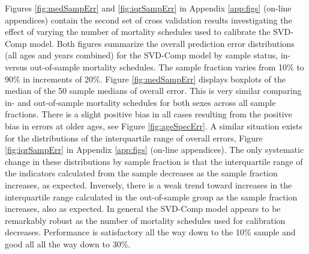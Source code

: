 \documentclass[11pt]{article}
\begin{document}
Figures \ref{fig:medSampErr} and \ref{fig:iqrSampErr} in Appendix \ref{app:figs} (on-line appendices) contain the second set of cross validation results investigating the effect of varying the number of mortality schedules used to calibrate the SVD-Comp model.  Both figures summarize the overall prediction error distributions (all ages and years combined) for the SVD-Comp model by sample status, in- versus out-of-sample mortality schedules.  The sample fraction varies from 10\% to 90\% in increments of 20\%.   Figure \ref{fig:medSampErr} displays boxplots of the median of  the 50 sample medians of overall error.  This is very similar comparing in- and out-of-sample mortality schedules for both sexes across all sample fractions.  There is a slight positive bias in all cases resulting from the positive bias in errors at older ages, see Figure \ref{fig:ageSpecErr}.  A similar situation exists for the distributions of the interquartile range of overall errors, Figure \ref{fig:iqrSampErr} in Appendix \ref{app:figs} (on-line appendices).  The only systematic change in these distributions by sample fraction is that the interquartile range of the indicators calculated from the sample decreases as the sample fraction increases, as expected.  Inversely, there is a weak trend toward increases in the interquartile range calculated in the out-of-sample group as the sample fraction increases, also as expected.  In general the SVD-Comp model appears to be remarkably robust as the number of mortality schedules used for calibration decreases.  Performance is satisfactory all the way down to the 10\% sample and good all all the way down to 30\%.
\end{document}
